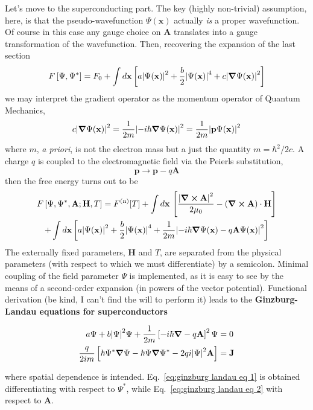 Let's move to the superconducting part. The key (highly non-trivial) assumption, here, is that the pseudo-wavefunction $\Psi(\mathbf{x})$ actually \textit{is} a proper wavefunction. Of course in this case any gauge choice on $\mathbf{A}$ translates into a gauge transformation of the wavefunction. Then, recovering the expansion of the last section
\[ 
    F\left[{\Psi,\Psi^*}\right] = F_0 + \int d\mathbf{x} \left[{
        a \abs{\Psi(\mathbf{x}) }^2 + \frac{b}{2} \abs{ \Psi(\mathbf{x}) }^4 + c \abs{\grad \Psi(\mathbf{x}) }^2
    }\right]
\]
we may interpret the gradient operator as the momentum operator of Quantum Mechanics,
\[
    c \abs{\grad \Psi(\mathbf{x}) }^2 = \frac{1}{2m} \abs{-i\hbar\grad \Psi(\mathbf{x}) }^2 = \frac{1}{2m} \abs{\mathbf{p} \Psi(\mathbf{x}) }^2
\]
where $m$, \textit{a priori}, is not the electron mass but a just the quantity $m=\hbar^2/2c$. A charge $q$ is coupled to the electromagnetic field via the Peierls substitution,
\[
    \mathbf{p} \to \mathbf{p} - q \mathbf{A}
\]
then the free energy turns out to be
\begin{multline*}
    F \left[{ \Psi,\Psi^*,\mathbf{A}; \mathbf{H},T }\right] = F^{(\mathrm{n})}[T] + \int d\mathbf{x} \, \left[{ \frac{\abs{\curl\mathbf{A}}^2}{2\mu_0} - \left({ \curl\mathbf{A} }\right) \cdot \mathbf{H} }\right] \\
    + \int d\mathbf{x} \left[{
        a \abs{\Psi(\mathbf{x}) }^2 + \frac{b}{2} \abs{ \Psi(\mathbf{x}) }^4 + \frac{1}{2m} \abs{-i\hbar\grad \Psi(\mathbf{x}) - q \mathbf{A} \Psi(\mathbf{x}) }^2
    }\right]
\end{multline*}
The externally fixed parameters, $\mathbf{H}$ and $T$, are separated from the physical parameters (with respect to which we must differentiate) by a semicolon. Minimal coupling of the field parameter $\Psi$ is implemented, as it is easy to see by the means of a second-order expansion (in powers of the vector potential). Functional derivation (be kind, I can't find the will to perform it) leads to the \textbf{Ginzburg-Landau equations for superconductors}
\begin{eqbox}
    \begin{align}
        a \Psi + b  \abs{\Psi}^2 \Psi + \frac{1}{2m} \left[{-i\hbar\grad - q \mathbf{A} }\right]^2 \Psi &= 0 \label{eq:ginzburg landau eq 1}\\
        \frac{q}{2im} \left[{ \hbar \Psi^* \grad \Psi - \hbar \Psi \grad \Psi^* - 2qi \abs{\Psi}^2 \mathbf{A}  }\right] &= \mathbf{J} \label{eq:ginzburg landau eq 2}
    \end{align}\vspace{-0.5em}
\end{eqbox}
where spatial dependence is intended. Eq.~\eqref{eq:ginzburg landau eq 1} is obtained differentiating with respect to $\Psi^*$, while Eq.~\eqref{eq:ginzburg landau eq 2} with respect to $\mathbf{A}$.

